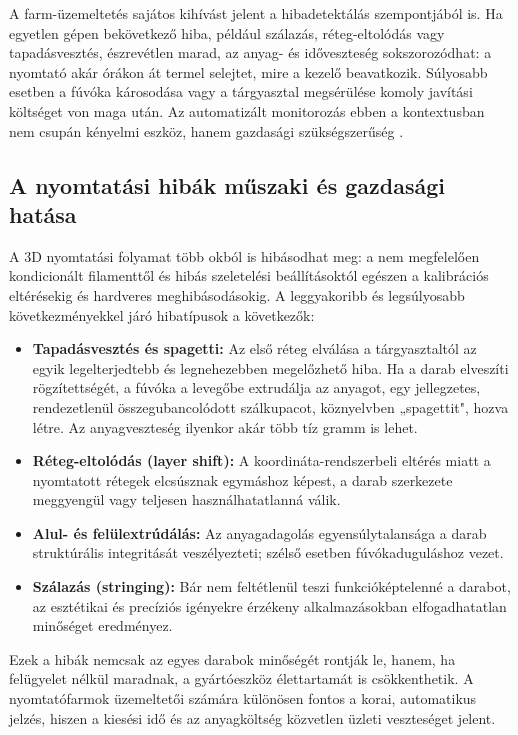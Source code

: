 A farm-üzemeltetés sajátos kihívást jelent a hibadetektálás szempontjából is. Ha egyetlen gépen
bekövetkező hiba, például szálazás, réteg-eltolódás vagy tapadásvesztés, észrevétlen marad, az
anyag- és időveszteség sokszorozódhat: a nyomtató akár órákon át termel selejtet, mire a kezelő
beavatkozik. Súlyosabb esetben a fúvóka károsodása vagy a tárgyasztal megsérülése komoly javítási
költséget von maga után. Az automatizált monitorozás ebben a kontextusban nem csupán kényelmi
eszköz, hanem gazdasági szükségszerűség \cite{obico2021}.

\subsection{A nyomtatási hibák műszaki és gazdasági hatása}

A 3D nyomtatási folyamat több okból is hibásodhat meg: a nem megfelelően kondicionált filamenttől
és hibás szeletelési beállításoktól egészen a kalibrációs eltérésekig és hardveres meghibásodásokig.
A leggyakoribb és legsúlyosabb következményekkel járó hibatípusok a következők:

\begin{itemize}
    \item \textbf{Tapadásvesztés és spagetti:} Az első réteg elválása a tárgyasztaltól az egyik
    legelterjedtebb és legnehezebben megelőzhető hiba. Ha a darab elveszíti rögzítettségét,
    a fúvóka a levegőbe extrudálja az anyagot, egy jellegzetes, rendezetlenül összegubancolódott
    szálkupacot, köznyelvben „spagettit", hozva létre. Az anyagveszteség ilyenkor akár több
    tíz gramm is lehet.
    \item \textbf{Réteg-eltolódás (layer shift):} A koordináta-rendszerbeli eltérés miatt a
    nyomtatott rétegek elcsúsznak egymáshoz képest, a darab szerkezete meggyengül vagy teljesen
    használhatatlanná válik.
    \item \textbf{Alul- és felülextrúdálás:} Az anyagadagolás egyensúlytalansága a darab
    struktúrális integritását veszélyezteti; szélső esetben fúvókaduguláshoz vezet.
    \item \textbf{Szálazás (stringing):} Bár nem feltétlenül teszi funkcióképtelenné a darabot,
    az esztétikai és precíziós igényekre érzékeny alkalmazásokban elfogadhatatlan
    minőséget eredményez.
\end{itemize}

Ezek a hibák nemcsak az egyes darabok minőségét rontják le, hanem, ha felügyelet nélkül maradnak,
a gyártóeszköz élettartamát is csökkenthetik. A nyomtatófarmok üzemeltetői számára különösen
fontos a korai, automatikus jelzés, hiszen a kiesési idő és az anyagköltség közvetlen üzleti
veszteséget jelent.

